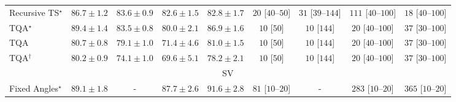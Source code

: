 \begin{tabular}{l|cccc|cccc|}
Recursive TS$^\star$ & {\cellcolor[HTML]{005E33}} \color[HTML]{F1F1F1} $86.7\pm 1.2$ & {\cellcolor[HTML]{076D39}} \color[HTML]{F1F1F1} $83.6\pm 0.9$ & {\cellcolor[HTML]{0C723B}} \color[HTML]{F1F1F1} $82.6\pm 1.5$ & {\cellcolor[HTML]{0B713B}} \color[HTML]{F1F1F1} $82.8\pm 1.7$ & {\cellcolor[HTML]{FFF4F0}} \color[HTML]{000000} $20$ [$40$--$50$] & {\cellcolor[HTML]{FFF2EE}} \color[HTML]{000000} $31$ [$39$--$144$] & {\cellcolor[HTML]{FDE0DD}} \color[HTML]{000000} $111$ [$40$--$100$] & {\cellcolor[HTML]{FFF5F1}} \color[HTML]{000000} $18$ [$40$--$100$] \\
TQA$^\star$ & {\cellcolor[HTML]{00502D}} \color[HTML]{F1F1F1} $89.4\pm 1.4$ & {\cellcolor[HTML]{086E3A}} \color[HTML]{F1F1F1} $83.5\pm 0.8$ & {\cellcolor[HTML]{1A7D40}} \color[HTML]{F1F1F1} $80.0\pm 2.1$ & {\cellcolor[HTML]{005D33}} \color[HTML]{F1F1F1} $86.9\pm 1.6$ & {\cellcolor[HTML]{FFF7F3}} \color[HTML]{000000} $10$ [$50$] & {\cellcolor[HTML]{FFF7F3}} \color[HTML]{000000} $10$ [$144$] & {\cellcolor[HTML]{FFF4F0}} \color[HTML]{000000} $20$ [$40$--$100$] & {\cellcolor[HTML]{FEF1ED}} \color[HTML]{000000} $37$ [$30$--$100$] \\
TQA & {\cellcolor[HTML]{177B3F}} \color[HTML]{F1F1F1} $80.7\pm 0.8$ & {\cellcolor[HTML]{1F8142}} \color[HTML]{F1F1F1} $79.1\pm 1.0$ & {\cellcolor[HTML]{45AD5F}} \color[HTML]{F1F1F1} $71.4\pm 4.6$ & {\cellcolor[HTML]{15793E}} \color[HTML]{F1F1F1} $81.0\pm 1.5$ & {\cellcolor[HTML]{FFF7F3}} \color[HTML]{000000} $10$ [$50$] & {\cellcolor[HTML]{FFF7F3}} \color[HTML]{000000} $10$ [$144$] & {\cellcolor[HTML]{FFF4F0}} \color[HTML]{000000} $20$ [$40$--$100$] & {\cellcolor[HTML]{FEF1ED}} \color[HTML]{000000} $37$ [$30$--$100$] \\
TQA$^\dagger$ & {\cellcolor[HTML]{197C40}} \color[HTML]{F1F1F1} $80.2\pm 0.9$ & {\cellcolor[HTML]{379E54}} \color[HTML]{F1F1F1} $74.1\pm 1.0$ & {\cellcolor[HTML]{55B567}} \color[HTML]{F1F1F1} $69.6\pm 5.1$ & {\cellcolor[HTML]{248644}} \color[HTML]{F1F1F1} $78.2\pm 2.1$ & {\cellcolor[HTML]{FFF7F3}} \color[HTML]{000000} $10$ [$50$] & {\cellcolor[HTML]{FFF7F3}} \color[HTML]{000000} $10$ [$144$] & {\cellcolor[HTML]{FFF4F0}} \color[HTML]{000000} $20$ [$40$--$100$] & {\cellcolor[HTML]{FEF1ED}} \color[HTML]{000000} $37$ [$30$--$100$] \\
\cline{1-9}
\multicolumn{9}{c}{\rule{0pt}{8pt}SV} \\
\midrule
Fixed Angles$^\star$ & {\cellcolor[HTML]{03456C}} \color[HTML]{F1F1F1} $89.1\pm 1.8$ & {\cellcolor[HTML]{000000}} \color[HTML]{F1F1F1} {\cellcolor{white}} \color{black} - & {\cellcolor[HTML]{034B76}} \color[HTML]{F1F1F1} $87.7\pm 2.6$ & {\cellcolor[HTML]{023858}} \color[HTML]{F1F1F1} $91.6\pm 2.8$ & {\cellcolor[HTML]{FEE6E3}} \color[HTML]{000000} $81$ [$10$--$20$] & {\cellcolor[HTML]{000000}} \color[HTML]{F1F1F1} {\cellcolor{white}} \color{black} - & {\cellcolor[HTML]{FBAAB8}} \color[HTML]{000000} $283$ [$10$--$20$] & {\cellcolor[HTML]{F984AB}} \color[HTML]{F1F1F1} $365$ [$10$--$20$] \\

\end{tabular}
